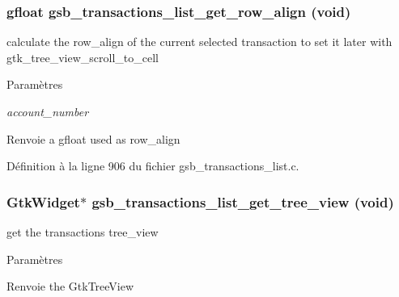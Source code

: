 \subsubsection[{gsb\_\-transactions\_\-list\_\-get\_\-row\_\-align}]{\setlength{\rightskip}{0pt plus 5cm}gfloat gsb\_\-transactions\_\-list\_\-get\_\-row\_\-align (void)}\label{gsb__transactions__list_8h_aaae69a76295b86b7baace98ce4066738}
calculate the row\_\-align of the current selected transaction to set it later with gtk\_\-tree\_\-view\_\-scroll\_\-to\_\-cell


\begin{DoxyParams}{Paramètres}
\item[{\em account\_\-number}]\end{DoxyParams}
\begin{DoxyReturn}{Renvoie}
a gfloat used as row\_\-align 
\end{DoxyReturn}


Définition à la ligne 906 du fichier gsb\_\-transactions\_\-list.c.

\subsubsection[{gsb\_\-transactions\_\-list\_\-get\_\-tree\_\-view}]{\setlength{\rightskip}{0pt plus 5cm}GtkWidget$\ast$ gsb\_\-transactions\_\-list\_\-get\_\-tree\_\-view (void)}\label{gsb__transactions__list_8h_a9c93505713234d8fa4727b067a140641}
get the transactions tree\_\-view


\begin{DoxyParams}{Paramètres}
\item[{\em }]\end{DoxyParams}
\begin{DoxyReturn}{Renvoie}
the GtkTreeView 
\end{DoxyReturn}


